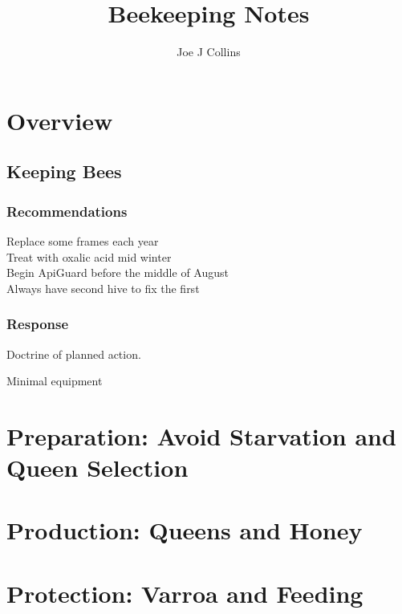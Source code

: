 \documentclass{./BeekeepingBook}
\title{Beekeeping Notes}
\author{Joe J Collins}
\date{\DTMnow}
\begin{document}
 
\maketitle
\tableofcontents

\chapter{Overview}

\section*{Keeping Bees}

\subsection*{Recommendations}

\begin{description}
  \item[Replace some frames each year]
  \item[Treat with oxalic acid mid winter]
  \item[Begin ApiGuard before the middle of August]
  \item[Always have second hive to fix the first]
\end{description}

\subsection*{Response}

Doctrine of planned action.

Minimal equipment

\chapter{Preparation: Avoid Starvation and Queen Selection}



\chapter{Production: Queens and Honey}



 
\chapter{Protection: Varroa and Feeding}



\end{document}
